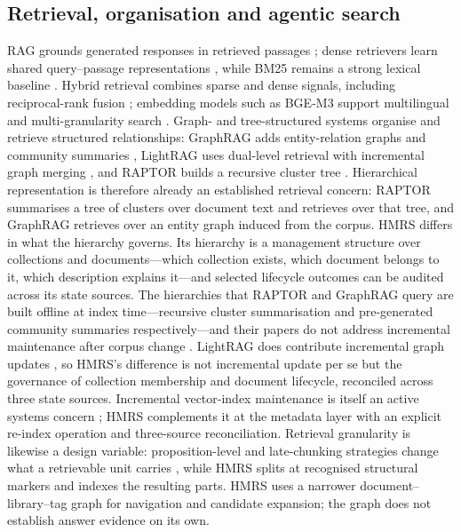 \subsection{Retrieval, organisation and agentic search}
RAG grounds generated responses in retrieved passages \citep{rag-lewis}; dense
retrievers learn shared query--passage representations \citep{dpr}, while BM25
remains a strong lexical baseline \citep{bm25}. Hybrid retrieval combines
sparse and dense signals, including reciprocal-rank fusion
\citep{rrf-cormack}; embedding models such as BGE-M3 support multilingual and
multi-granularity search \citep{bge-m3}. Graph- and tree-structured systems
organise and retrieve structured relationships: GraphRAG adds entity-relation
graphs and community summaries \citep{graphrag}, LightRAG uses dual-level
retrieval with incremental graph merging \citep{lightrag}, and RAPTOR builds a
recursive cluster tree \citep{raptor}. Hierarchical representation is therefore already an
established retrieval concern: RAPTOR summarises a tree of clusters over
document text and retrieves over that tree, and GraphRAG retrieves over an
entity graph induced from the corpus. HMRS differs in what the hierarchy
governs. Its hierarchy is a management structure over collections and
documents---which collection exists, which document belongs to it, which
description explains it---and selected lifecycle outcomes can be audited
across its state sources. The hierarchies that RAPTOR and GraphRAG query are built
offline at index time---recursive cluster summarisation and pre-generated
community summaries respectively---and their papers do not address
incremental maintenance after corpus change \cite{raptor,graphrag}. LightRAG
does contribute incremental graph updates \citep{lightrag}, so HMRS's
difference is not incremental update per se but the governance of collection
membership and document lifecycle, reconciled across three state sources.
Incremental vector-index maintenance is itself an
active systems concern \cite{singh2021freshdiskann,xu2023spfresh}; HMRS
complements it at the metadata layer with an explicit re-index operation and
three-source reconciliation. Retrieval granularity is likewise a design
variable: proposition-level and late-chunking strategies change what a
retrievable unit carries \cite{chen2024dense,gunther2024late}, while HMRS
splits at recognised structural markers and indexes the resulting parts.
HMRS uses a
narrower document--library--tag graph for navigation and candidate
expansion; the graph does not establish answer evidence on its own.

